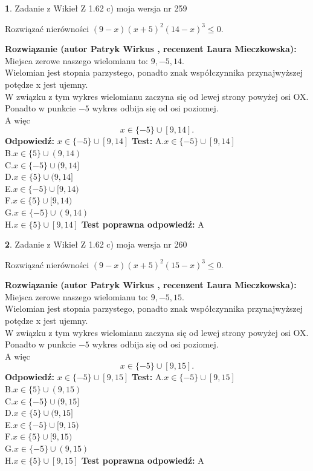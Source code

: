 \documentclass[12pt, a4paper]{article}
\theoremstyle{definition} %
\newtheorem{zad}{}
\newcommand{\zadStart}[1]{\begin{zad}#1\newline}
\newcommand{\zadStop}{\end{zad}}
\newcommand{\rozwStart}[2]{\noindent \textbf{Rozwiązanie (autor #1 , recenzent #2): }\newline}
\newcommand{\rozwStop}{\newline}
\newcommand{\odpStart}{\noindent \textbf{Odpowiedź:}\newline}
\newcommand{\odpStop}{\newline}
\newcommand{\testStart}{\noindent \textbf{Test:}\newline}
\newcommand{\testStop}{\newline}
\newcommand{\kluczStart}{\noindent \textbf{Test poprawna odpowiedź:}\newline}
\newcommand{\kluczStop}{\newline}
\begin{document}
\zadStart{Zadanie z Wikieł Z 1.62 c) moja wersja nr 259}

Rozwiązać nierówności $(9-x)(x+5)^{2}(14-x)^{3}\le0$.
\zadStop
\rozwStart{Patryk Wirkus}{Laura Mieczkowska}
Miejsca zerowe naszego wielomianu to: $9, -5, 14$.\\
Wielomian jest stopnia parzystego, ponadto znak współczynnika przy\linebreak najwyższej potędze x jest ujemny.\\ W związku z tym wykres wielomianu zaczyna się od lewej strony powyżej osi OX.\\
Ponadto w punkcie $-5$ wykres odbija się od osi poziomej.\\
A więc $$x \in \{-5\} \cup [9,14].$$
\rozwStop
\odpStart
$x \in \{-5\} \cup [9,14]$
\odpStop
\testStart
A.$x \in \{-5\} \cup [9,14]$\\
B.$x \in \{5\} \cup (9,14)$\\
C.$x \in \{-5\} \cup (9,14]$\\
D.$x \in \{5\} \cup (9,14]$\\
E.$x \in \{-5\} \cup [9,14)$\\
F.$x \in \{5\} \cup [9,14)$\\
G.$x \in \{-5\} \cup (9,14)$\\
H.$x \in \{5\} \cup [9,14]$
\testStop
\kluczStart
A
\kluczStop



\zadStart{Zadanie z Wikieł Z 1.62 c) moja wersja nr 260}

Rozwiązać nierówności $(9-x)(x+5)^{2}(15-x)^{3}\le0$.
\zadStop
\rozwStart{Patryk Wirkus}{Laura Mieczkowska}
Miejsca zerowe naszego wielomianu to: $9, -5, 15$.\\
Wielomian jest stopnia parzystego, ponadto znak współczynnika przy\linebreak najwyższej potędze x jest ujemny.\\ W związku z tym wykres wielomianu zaczyna się od lewej strony powyżej osi OX.\\
Ponadto w punkcie $-5$ wykres odbija się od osi poziomej.\\
A więc $$x \in \{-5\} \cup [9,15].$$
\rozwStop
\odpStart
$x \in \{-5\} \cup [9,15]$
\odpStop
\testStart
A.$x \in \{-5\} \cup [9,15]$\\
B.$x \in \{5\} \cup (9,15)$\\
C.$x \in \{-5\} \cup (9,15]$\\
D.$x \in \{5\} \cup (9,15]$\\
E.$x \in \{-5\} \cup [9,15)$\\
F.$x \in \{5\} \cup [9,15)$\\
G.$x \in \{-5\} \cup (9,15)$\\
H.$x \in \{5\} \cup [9,15]$
\testStop
\kluczStart
A
\kluczStop
\end{document}
